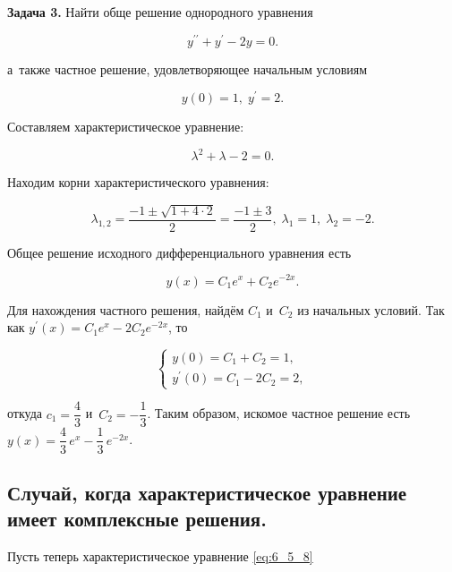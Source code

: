 \textbf{Задача 3.}\label{ex:6_5_3} Найти обще решение однородного уравнения

\begin{equation*}
y^{\prime\prime} + y^\prime - 2y = 0.
\end{equation*}

\noindent
а~также частное решение, удовлетворяющее начальным условиям

\begin{equation*}
y(0) = 1, \; y^\prime = 2.
\end{equation*}

Составляем характеристическое уравнение:

\begin{equation*}
\lambda^{2} + \lambda - 2 = 0.
\end{equation*}

\noindent
Находим корни характеристического уравнения:

\begin{equation*}
\lambda_{1,2} = \dfrac{-1 \pm \sqrt{1 + 4 \cdot 2}}{2} = \dfrac{-1 \pm 3}{2}, \;
\lambda_{1} = 1, \; \lambda_{2} = -2.
\end{equation*}

\noindent
Общее решение исходного дифференциального уравнения есть

\begin{equation*}
y(x) = C_{1} e^{x} + C_{2} e^{-2x}.
\end{equation*}

\noindent
Для нахождения частного решения, найдём $C_{1}$ и~$C_{2}$ из начальных условий.
Так как $y^\prime (x) = C_{1} e^{x} - 2C_{2} e^{-2x}$, то

\begin{equation*}
\begin{cases}
y(0) = C_{1} + C_{2} = 1, \\
y^\prime (0) = C_{1} - 2C_{2} = 2,
\end{cases}
\end{equation*}

\noindent
откуда $c_{1} = \dfrac{4}{3}$ и~$C_{2} = -\dfrac{1}{3}$.
Таким образом, искомое частное решение есть
$y(x) = \dfrac{4}{3} \, e^{x} - \dfrac{1}{3} \, e^{-2x}$.


\subsection{Случай, когда характеристическое уравнение имеет комплексные решения.}

Пусть теперь характеристическое уравнение \eqref{eq:6_5_8}

